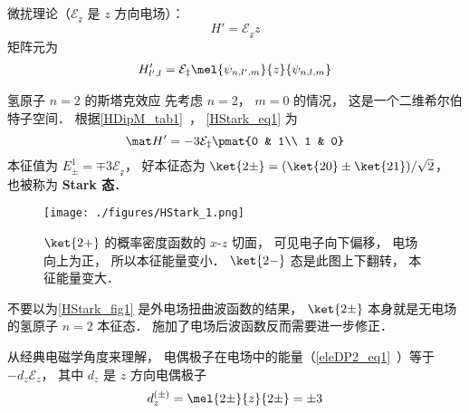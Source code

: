 
\begin{issues}
\issueDraft
\end{issues}


微扰理论（$\mathcal{E_z}$ 是 $z$ 方向电场）：
\begin{equation}
H' = \mathcal{E_z} z
\end{equation}
矩阵元为
\begin{equation}\label{HStark_eq1}
H'_{l',l} = \mathcal{E_z}\mel{\psi_{n,l',m}}{z}{\psi_{n,l,m}}
\end{equation}


\begin{example}{氢原子 $n=2$ 的斯塔克效应}
先考虑 $n=2$， $m=0$ 的情况， 这是一个二维希尔伯特子空间． 根据\autoref{HDipM_tab1}~， \autoref{HStark_eq1} 为
\begin{equation}
\mat H' = -3\mathcal{E_z}\pmat{0 & 1\\ 1 & 0}
\end{equation}
本征值为 $E_{\pm}^1 = \mp 3\mathcal{E_z}$， 好本征态为 $\ket{2\pm} = (\ket{20} \pm \ket{21})/{\sqrt 2}$， 也被称为 \textbf{Stark 态}．

\begin{figure}[ht]
\centering
\texttt{[image: ./figures/HStark\_1.png]}
\caption{$\ket{2+}$ 的概率密度函数的 $x$-$z$ 切面， 可见电子向下偏移， 电场向上为正， 所以本征能量变小． $\ket{2-}$ 态是此图上下翻转， 本征能量变大．} \label{HStark_fig1}
\end{figure}

不要以为\autoref{HStark_fig1} 是外电场扭曲波函数的结果， $\ket{2\pm}$ 本身就是无电场的氢原子 $n=2$ 本征态． 施加了电场后波函数反而需要进一步修正．

从经典电磁学角度来理解， 电偶极子在电场中的能量（\autoref{eleDP2_eq1}~）等于 $-d_z \mathcal{E}_z$， 其中 $d_z$ 是 $z$ 方向电偶极子
\begin{equation}
d_z^{(\pm)} = \mel{2\pm}{z}{2\pm} = \pm 3
\end{equation}
\end{example}

